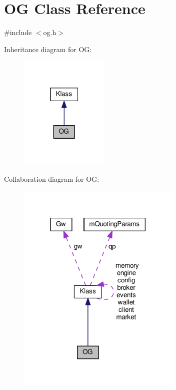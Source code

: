 \hypertarget{class_k_1_1_o_g}{}\section{OG Class Reference}
\label{class_k_1_1_o_g}


{\ttfamily \#include $<$og.\+h$>$}



Inheritance diagram for OG\+:
\nopagebreak
\begin{figure}[H]
\begin{center}
\leavevmode
\includegraphics[width=121pt]{class_k_1_1_o_g__inherit__graph}
\end{center}
\end{figure}


Collaboration diagram for OG\+:
\nopagebreak
\begin{figure}[H]
\begin{center}
\leavevmode
\includegraphics[width=222pt]{class_k_1_1_o_g__coll__graph}
\end{center}
\end{figure}
